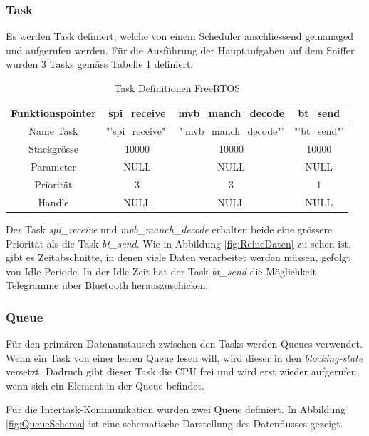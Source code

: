\subsubsection{Task}
Es werden Task definiert, welche von einem Scheduler anschliessend gemanaged und aufgerufen werden. Für die Ausführung der Hauptaufgaben auf dem Sniffer wurden 3 Tasks gemäss Tabelle \ref{tab:TaskDefinitonen} definiert.

\begin{table}[H]
    \centering
    \begin{tabular}{|c||c|c|c|}
        \hline
        Funktionspointer & spi\_receive  & mvb\_manch\_decode & bt\_send\\ 
        \hline
        Name Task  & "'spi\_receive"' & "'mvb\_manch\_decode"' & "'bt\_send"'\\ 
        \hline
        Stackgrösse & 10000 & 10000 & 10000\\ 
        \hline
        Parameter & NULL & NULL & NULL\\ 
        \hline
        Priorität & 3 & 3 & 1\\ 
        \hline
        Handle & NULL & NULL & NULL\\ 
        \hline
    \end{tabular}
    \caption{Task Definitionen FreeRTOS}
    \label{tab:TaskDefinitonen}
\end{table}

Der Task \textit{spi\_receive} und \textit{mvb\_manch\_decode} erhalten beide eine grössere Priorität als die Task \textit{bt\_send}. Wie in Abbildung \ref{fig:ReineDaten} zu sehen ist, gibt es Zeitabschnitte, in denen viele Daten verarbeitet werden müssen, gefolgt von Idle-Periode. In der Idle-Zeit hat der Task \textit{bt\_send} die Möglichkeit Telegramme über Bluetooth herauszuschicken.


\subsubsection{Queue}
\label{subsub:Queue}
Für den primären Datenaustausch zwischen den Tasks werden Queues verwendet. Wenn ein Task von einer leeren Queue lesen will, wird dieser in den \textit{blocking-state} versetzt. Dadruch gibt dieser Task die CPU frei und wird erst wieder aufgerufen, wenn sich ein Element in der Queue befindet.

Für die Intertask-Kommunikation wurden zwei Queue definiert. In Abbildung \ref{fig:QueueSchema} ist eine schematische Darstellung des Datenflusses gezeigt.


